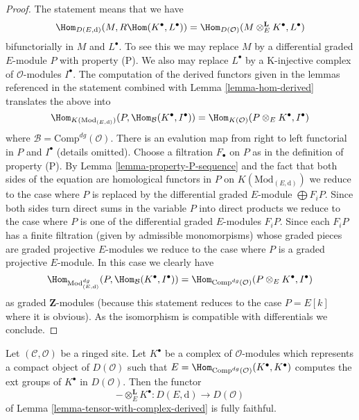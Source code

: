 \begin{proof}
The statement means that we have
$$
\Hom_{D(E, \text{d})}(M, R\Hom(K^\bullet, L^\bullet)) =
\Hom_{D(\mathcal{O})}(M \otimes^\mathbf{L}_E K^\bullet, L^\bullet)
$$
bifunctorially in $M$ and $L^\bullet$. To see this we may replace $M$
by a differential graded $E$-module $P$ with property (P).
We also may replace $L^\bullet$ by a K-injective complex of
$\mathcal{O}$-modules $I^\bullet$. The computation
of the derived functors given in the lemmas referenced in the statement
combined with Lemma \ref{lemma-hom-derived} translates the above into
$$
\Hom_{K(\text{Mod}_{(E, \text{d})})}
(P, \Hom_\mathcal{B}(K^\bullet, I^\bullet)) =
\Hom_{K(\mathcal{O})}(P \otimes_E K^\bullet, I^\bullet)
$$
where $\mathcal{B} = \text{Comp}^{dg}(\mathcal{O})$. 
There is an evalution map from right to left functorial
in $P$ and $I^\bullet$ (details omitted).
Choose a filtration $F_\bullet$ on $P$ as in the definition of property (P).
By Lemma \ref{lemma-property-P-sequence} and the fact that
both sides of the equation are homological functors in $P$
on $K(\text{Mod}_{(E, \text{d})})$
we reduce to the case where $P$ is replaced by
the differential graded $E$-module $\bigoplus F_iP$.
Since both sides turn direct sums in the variable $P$
into direct products we reduce to the case where $P$ is one of the
differential graded $E$-modules $F_iP$.
Since each $F_iP$ has a finite filtration (given by admissible
monomorpisms) whose graded pieces are graded projective $E$-modules
we reduce to the case where $P$ is a graded projective $E$-module.
In this case we clearly have
$$
\Hom_{\text{Mod}^{dg}_{(E, \text{d})}}
(P, \Hom_\mathcal{B}(K^\bullet, I^\bullet)) =
\Hom_{\text{Comp}^{dg}(\mathcal{O})}(P \otimes_E K^\bullet, I^\bullet)
$$
as graded $\mathbf{Z}$-modules (because this statement reduces to the case
$P = E[k]$ where it is obvious). As the isomorphism is compatible with
differentials we conclude.
\end{proof}

\begin{lemma}
\label{lemma-fully-faithful-in-compact-case}
Let $(\mathcal{C}, \mathcal{O})$ be a ringed site.
Let $K^\bullet$ be a complex of $\mathcal{O}$-modules
which represents a compact object of $D(\mathcal{O})$
such that $E = \Hom_{\text{Comp}^{dg}(\mathcal{O})}(K^\bullet, K^\bullet)$
computes the ext groups of $K^\bullet$ in $D(\mathcal{O})$.
Then the functor
$$
- \otimes_E^\mathbf{L} K^\bullet :
D(E, \text{d})
\longrightarrow
D(\mathcal{O})
$$
of Lemma \ref{lemma-tensor-with-complex-derived} is fully faithful.
\end{lemma}

